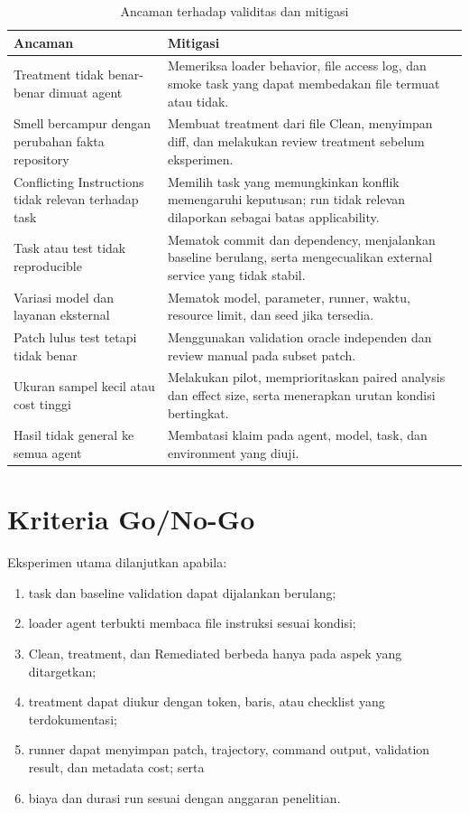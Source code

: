 \begin{table}[htbp]
\centering
\small
\renewcommand{\arraystretch}{1.25}
\caption{Ancaman terhadap validitas dan mitigasi}
\label{tab:validity}
\begin{tabularx}{\textwidth}{p{4.0cm}Y}
\toprule
\textbf{Ancaman} & \textbf{Mitigasi} \\
\midrule
Treatment tidak benar-benar dimuat agent & Memeriksa loader behavior, file access log, dan smoke task yang dapat membedakan file termuat atau tidak. \\
Smell bercampur dengan perubahan fakta repository & Membuat treatment dari file Clean, menyimpan diff, dan melakukan review treatment sebelum eksperimen. \\
Conflicting Instructions tidak relevan terhadap task & Memilih task yang memungkinkan konflik memengaruhi keputusan; run tidak relevan dilaporkan sebagai batas applicability. \\
Task atau test tidak reproducible & Mematok commit dan dependency, menjalankan baseline berulang, serta mengecualikan external service yang tidak stabil. \\
Variasi model dan layanan eksternal & Mematok model, parameter, runner, waktu, resource limit, dan seed jika tersedia. \\
Patch lulus test tetapi tidak benar & Menggunakan validation oracle independen dan review manual pada subset patch. \\
Ukuran sampel kecil atau cost tinggi & Melakukan pilot, memprioritaskan paired analysis dan effect size, serta menerapkan urutan kondisi bertingkat. \\
Hasil tidak general ke semua agent & Membatasi klaim pada agent, model, task, dan environment yang diuji. \\
\bottomrule
\end{tabularx}
\end{table}

\section{Kriteria Go/No-Go}

Eksperimen utama dilanjutkan apabila:

\begin{enumerate}[leftmargin=*]
    \item task dan baseline validation dapat dijalankan berulang;
    \item loader agent terbukti membaca file instruksi sesuai kondisi;
    \item Clean, treatment, dan Remediated berbeda hanya pada aspek yang ditargetkan;
    \item treatment dapat diukur dengan token, baris, atau checklist yang terdokumentasi;
    \item runner dapat menyimpan patch, trajectory, command output, validation result, dan metadata cost; serta
    \item biaya dan durasi run sesuai dengan anggaran penelitian.
\end{enumerate}

